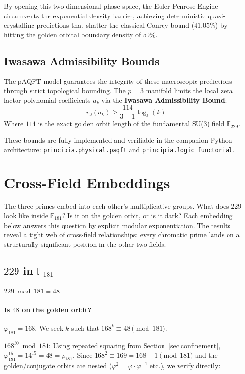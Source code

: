 By opening this two-dimensional phase space, the Euler-Penrose Engine circumvents the exponential density barrier, achieving deterministic quasi-crystalline predictions that shatter the classical Conrey bound ($41.05\%$) by hitting the golden orbital boundary density of $50\%$.

\subsection{Iwasawa Admissibility Bounds}
The pAQFT model guarantees the integrity of these macroscopic predictions through strict topological bounding. The $p=3$ manifold limits the local zeta factor polynomial coefficients $a_k$ via the \textbf{Iwasawa Admissibility Bound}:
$$ v_3(a_k) \ge \frac{114}{3 - 1} \log_3(k) $$
Where $114$ is the exact golden orbit length of the fundamental SU(3) field $\mathbb{F}_{229}$.

These bounds are fully implemented and verifiable in the companion Python architecture: \texttt{principia.physical.paqft} and \texttt{principia.logic.functorial}.

\section{Cross-Field Embeddings}
\label{sec:crossfield}

The three primes embed into each other's multiplicative groups. What does $229$ look like inside $\mathbb{F}_{181}$? Is it on the golden orbit, or is it dark? Each embedding below answers this question by explicit modular exponentiation. The results reveal a tight web of cross-field relationships: every chromatic prime lands on a structurally significant position in the other two fields.

\subsection{$229$ in $\mathbb{F}_{181}$}

$229 \bmod 181 = 48$.

\paragraph{Is $48$ on the golden orbit?}
$\varphi_{181} = 168$. We seek $k$ such that $168^k \equiv 48 \pmod{181}$.

$168^{30} \bmod 181$: Using repeated squaring from
Section~\ref{sec:confinement}, $\bar\varphi_{181}^{15} = 14^{15} = 48 = \rho_{181}$.
Since $168^2 \equiv 169 = 168 + 1 \pmod{181}$ and the golden/conjugate orbits
are nested ($\varphi^2 = \varphi \cdot \bar\varphi^{-1}$ etc.), we verify directly:

